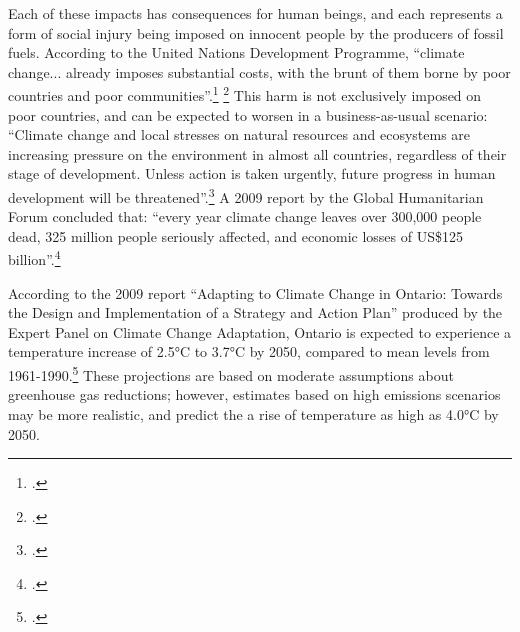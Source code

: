 \documentclass[10pt]{article}
\begin{document}
Each of these impacts has consequences for human beings, and each represents a form of social injury being imposed on innocent people by the producers of fossil fuels.
According to the United Nations Development Programme, ``climate change... already imposes substantial costs, with the brunt of them borne by poor countries and poor communities''.\footcite[][p. 34]{UNHumanDev2013} \footcite[See also: ][]{WorldBankDevCC}
This harm is not exclusively imposed on poor countries, and can be expected to worsen in a business-as-usual scenario: ``Climate change and local stresses on natural resources and ecosystems are increasing pressure on the environment in almost all countries, regardless of their stage of development. Unless action is taken urgently, future progress in human development will be threatened''.\footcite[][p. 87]{UNHumanDev2013}
A 2009 report by the Global Humanitarian Forum concluded that: ``every year climate change leaves over 300,000 people 
dead, 325 million people seriously affected, and economic losses of US\$125 billion''.\footcite[][p. 1]{AnatomySilentCrisis}



According to the 2009 report ``Adapting to Climate Change in Ontario: Towards the Design and Implementation of a Strategy and Action Plan'' produced by the Expert Panel on Climate Change Adaptation, Ontario is expected to experience a temperature increase of 2.5°C to 3.7°C by 2050, compared to mean levels from 1961-1990.\footcite[][p. 15]{ExpertPanelAdapting2009}
These projections are based on moderate assumptions about greenhouse gas reductions; however, estimates based on high emissions scenarios may be more realistic, and predict the a rise of temperature as high as 4.0°C by 2050.
\end{document}
